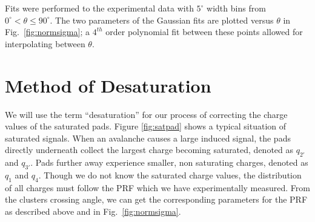 \documentclass[review,number,sort&compress]{elsarticle}
\begin{document}

 
Fits were performed to the experimental data with  $5^{\circ}$ width bins from $0^{\circ} < \theta \leq 90^{\circ}$. The two parameters of the Gaussian fits are plotted versus $\theta$ in Fig.~\ref{fig:normsigma}; a $4^{th}$ order polynomial fit between these points allowed for interpolating between $\theta$.

\section{Method of Desaturation}
We will use the term ``desaturation'' for our process of correcting the charge values of the saturated pads. Figure \ref{fig:satpad} shows a typical situation of saturated signals. When an avalanche causes a large induced signal, the pads directly underneath collect the largest charge becoming saturated, denoted as $q_{2'}$ and $q_{3'}$. Pads further away experience smaller, non saturating charges, denoted as $q_{1}$ and $q_{4}$. Though we do not know the saturated charge values, the distribution of all charges must follow the PRF which we have experimentally measured. From the clusters crossing angle, we can get the corresponding parameters for the PRF as described above and in Fig.~\ref{fig:normsigma}.
\end{document}
